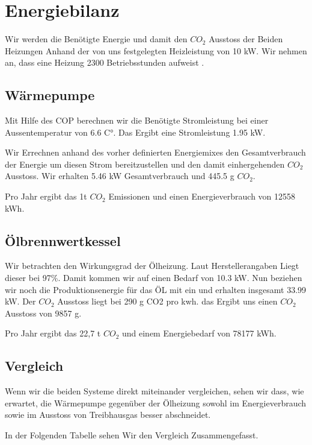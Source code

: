 \chapter{Energiebilanz}
\label{chap:bilanz}

Wir werden die Benötigte Energie und damit den $CO_2$ Ausstoss der Beiden
Heizungen Anhand der von uns festgelegten Heizleistung von 10 kW.
Wir nehmen an, dass eine Heizung 2300 Betriebsstunden aufweist
\cite{heizung:heizung}.

\section{Wärmepumpe}

Mit Hilfe des COP berechnen wir die Benötigte Stromleistung bei einer
Aussentemperatur von 6.6 C°.
Das Ergibt eine Stromleistung 1.95 kW.

Wir Errechnen anhand des vorher definierten Energiemixes den Gesamtverbrauch
der Energie um diesen Strom bereitzustellen und den damit einhergehenden $CO_2$
Ausstoss.
Wir erhalten 5.46 kW Gesamtverbrauch und 445.5 g $CO_2$.

Pro Jahr ergibt das 1t $CO_2$ Emissionen und einen Energieverbrauch von 12558 kWh.

\section{Ölbrennwertkessel}

Wir betrachten den Wirkungsgrad der Ölheizung.
Laut Herstellerangaben Liegt dieser bei 97\%.
Damit kommen wir auf einen Bedarf von 10.3 kW.
Nun beziehen wir noch die Produktionsenergie für das ÖL mit ein und erhalten
insgesamt 33.99 kW.
Der $CO_2$ Ausstoss liegt bei 290 g CO2 pro kwh.\cite{heizung:co2vergleich}
das Ergibt uns einen $CO_2$ Ausstoss von 9857 g.

Pro Jahr ergibt das 22,7 t $CO_2$ und einem Energiebedarf von 78177 kWh.


\section{Vergleich}

Wenn wir die beiden Systeme direkt miteinander vergleichen, sehen wir dass,
wie erwartet, die Wärmepumpe gegenüber der Ölheizung
sowohl im Energieverbrauch sowie im Ausstoss von Treibhausgas besser abschneidet.

In der Folgenden Tabelle sehen Wir den Vergleich Zusammengefasst.

